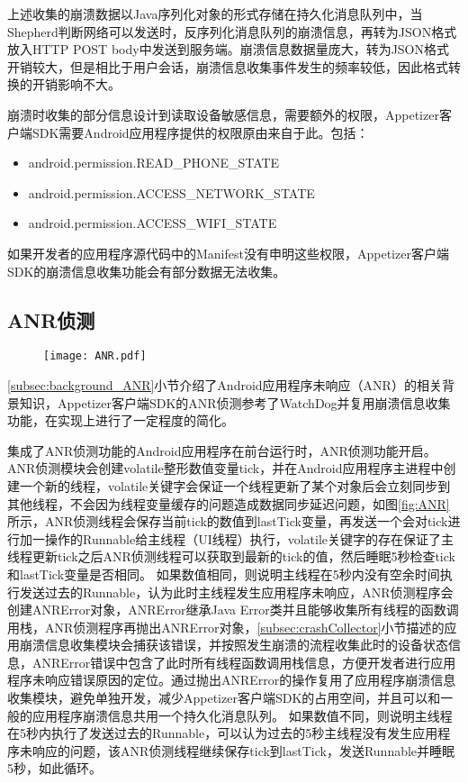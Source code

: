  上述收集的崩溃数据以Java序列化对象的形式存储在持久化消息队列中，当Shepherd判断网络可以发送时，反序列化消息队列的崩溃信息，再转为JSON格式放入HTTP POST body中发送到服务端。崩溃信息数据量庞大，转为JSON格式开销较大，但是相比于用户会话，崩溃信息收集事件发生的频率较低，因此格式转换的开销影响不大。
 
 崩溃时收集的部分信息设计到读取设备敏感信息，需要额外的权限，Appetizer客户端SDK需要Android应用程序提供的权限原由来自于此。包括：
 
\begin{itemize}
 	\item android.permission.READ\_PHONE\_STATE
 	\item android.permission.ACCESS\_NETWORK\_STATE
 	\item android.permission.ACCESS\_WIFI\_STATE
\end{itemize}

如果开发者的应用程序源代码中的Manifest没有申明这些权限，Appetizer客户端SDK的崩溃信息收集功能会有部分数据无法收集。

\subsection{ANR侦测}
\label{subsec:ANRCollector}


\begin{figure}[!htp]
	\centering
	\texttt{[image: ANR.pdf]}
\end{figure}

\ref{subsec:background_ANR}小节介绍了Android应用程序未响应（ANR）的相关背景知识，Appetizer客户端SDK的ANR侦测参考了WatchDog并复用崩溃信息收集功能，在实现上进行了一定程度的简化。

集成了ANR侦测功能的Android应用程序在前台运行时，ANR侦测功能开启。ANR侦测模块会创建volatile整形数值变量tick，并在Android应用程序主进程中创建一个新的线程，volatile关键字会保证一个线程更新了某个对象后会立刻同步到其他线程，不会因为线程变量缓存的问题造成数据同步延迟问题，如图\ref{fig:ANR}所示，ANR侦测线程会保存当前tick的数值到lastTick变量，再发送一个会对tick进行加一操作的Runnable给主线程（UI线程）执行，volatile关键字的存在保证了主线程更新tick之后ANR侦测线程可以获取到最新的tick的值，然后睡眠5秒检查tick和lastTick变量是否相同。
如果数值相同，则说明主线程在5秒内没有空余时间执行发送过去的Runnable，认为此时主线程发生应用程序未响应，ANR侦测程序会创建ANRError对象，ANRError继承Java Error类并且能够收集所有线程的函数调用栈，ANR侦测程序再抛出ANRError对象，\ref{subsec:crashCollector}小节描述的应用崩溃信息收集模块会捕获该错误，并按照发生崩溃的流程收集此时的设备状态信息，ANRError错误中包含了此时所有线程函数调用栈信息，方便开发者进行应用程序未响应错误原因的定位。通过抛出ANRError的操作复用了应用程序崩溃信息收集模块，避免单独开发，减少Appetizer客户端SDK的占用空间，并且可以和一般的应用程序崩溃信息共用一个持久化消息队列。
如果数值不同，则说明主线程在5秒内执行了发送过去的Runnable，可以认为过去的5秒主线程没有发生应用程序未响应的问题，该ANR侦测线程继续保存tick到lastTick，发送Runnable并睡眠5秒，如此循环。

